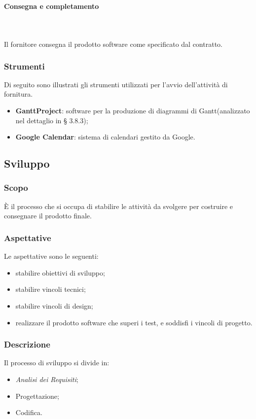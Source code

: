 			\paragraph{Consegna e completamento} \mbox{} \\ \mbox{} \\		
			Il fornitore consegna il prodotto software come specificato dal contratto.
		\subsubsection{Strumenti}
		Di seguito sono illustrati gli strumenti utilizzati per l'avvio dell'attività di fornitura.
		\begin{itemize}
			\item \textbf{GanttProject}: software per la produzione di diagrammi di Gantt\glo (analizzato nel dettaglio in § 3.8.3);
			\item \textbf{Google Calendar}: sistema di calendari gestito da Google.
		\end{itemize}

	\subsection{Sviluppo}
		\subsubsection{Scopo}È il processo che si occupa di stabilire le attività da svolgere per costruire e consegnare il prodotto finale.
		\subsubsection{Aspettative}
		Le aspettative sono le seguenti:
			\begin{itemize}
				\item stabilire obiettivi di sviluppo;
				\item stabilire vincoli tecnici;
				\item stabilire vincoli di design;
				\item realizzare il prodotto software che superi i test, e soddisfi i vincoli di progetto.
			\end{itemize}
		\subsubsection{Descrizione}
			Il processo di sviluppo si divide in:
				\begin{itemize}
					\item \textit{Analisi dei Requisiti};
					\item Progettazione;
					\item Codifica.
				\end{itemize}
